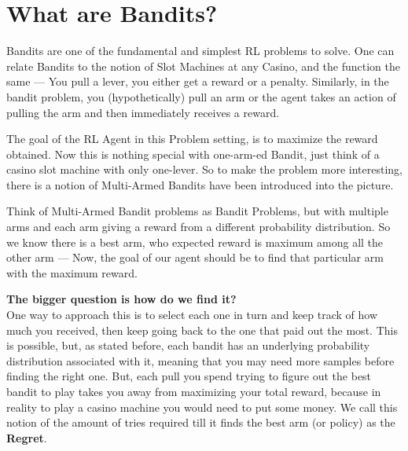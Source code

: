 \section{What are Bandits?}
Bandits are one of the fundamental and simplest RL problems to solve.
One can relate Bandits to the notion of Slot Machines at any Casino, and the function the same --- You pull a lever, you either get a reward or a penalty.
Similarly, in the bandit problem, you (hypothetically) pull an arm or the agent takes an action of pulling the arm and then immediately receives a reward.

The goal of the RL Agent in this Problem setting, is to maximize the reward obtained.
Now this is nothing special with one-arm-ed Bandit, just think of a casino slot machine with only one-lever. So to make the problem more interesting, there is a notion of Multi-Armed Bandits have been introduced into the picture.

Think of Multi-Armed Bandit problems as Bandit Problems, but with multiple arms and each arm giving a reward from a different probability distribution.
So we know there is a best arm, who expected reward is maximum among all the other arm --- Now, the goal of our agent should be to find that particular arm with the maximum reward.

\noindent\textbf{The bigger question is how do we find it?}
\\One way to approach this is to select each one in turn and keep track of how much you received, then keep going back to the one that paid out the most.
This is possible, but, as stated before, each bandit has an underlying probability distribution associated with it, meaning that you may need more samples before finding the right one.
But, each pull you spend trying to figure out the best bandit to play takes you away from maximizing your total reward, because in reality to play a casino machine you would need to put some money.
We call this notion of the amount of tries required till it finds the best arm (or policy) as the \textbf{Regret}.